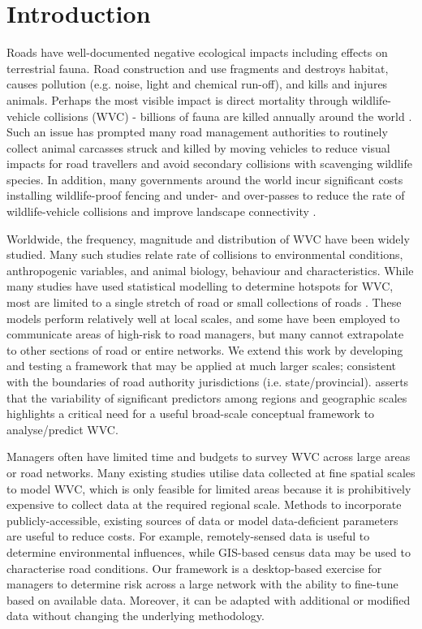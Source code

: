 \newpage
\section{Introduction}

Roads have well-documented negative ecological impacts \citep{form98,spel98,rvdr15} including effects on terrestrial fauna. Road construction and use fragments and destroys habitat, causes pollution (e.g. noise, light and chemical run-off), and kills and injures animals. Perhaps the most visible impact is direct mortality through wildlife-vehicle collisions (WVC) - billions of fauna are killed annually around the world \citep{seil06}. Such an issue has prompted many road management authorities to routinely collect animal carcasses struck and killed by moving vehicles to reduce visual impacts for road travellers \citep{huij07b} and avoid secondary collisions with scavenging wildlife species. In addition, many governments around the world incur significant costs installing wildlife-proof fencing and under- and over-passes to reduce the rate of wildlife-vehicle collisions and improve landscape connectivity \citep{rvdr15}.

Worldwide, the frequency, magnitude and distribution of WVC have been widely studied. Many such studies relate rate of collisions to environmental conditions, anthropogenic variables, and animal biology, behaviour and characteristics. While many studies have used statistical modelling to determine hotspots for WVC, most are limited to a single stretch of road or small collections of roads \citep{gund98,clev01,clev03,ramp05,ramp06b,gome08,lang09,hurl09,roge09,hoth12,mark12,sant13,seo15}. These models perform relatively well at local scales, and some have been employed to communicate areas of high-risk to road managers, but many cannot extrapolate to other sections of road or entire networks. We extend this work by developing and testing a framework that may be applied at much larger scales; consistent with the boundaries of road authority jurisdictions (i.e. state/provincial). \cite{clev15} asserts that the variability of significant predictors among regions and geographic scales highlights a critical need for a useful broad-scale conceptual framework to analyse/predict WVC.

Managers often have limited time and budgets to survey WVC across large areas or road networks. Many existing studies utilise data collected at fine spatial scales to model WVC, which is only feasible for limited areas because it is prohibitively expensive to collect data at the required regional scale. Methods to incorporate publicly-accessible, existing sources of data or model data-deficient parameters are useful to reduce costs. For example, remotely-sensed data is useful to determine environmental influences, while GIS-based census data may be used to characterise road conditions. Our framework is a desktop-based exercise for managers to determine risk across a large network with the ability to fine-tune based on available data. Moreover, it can be adapted with additional or modified data without changing the underlying methodology.


